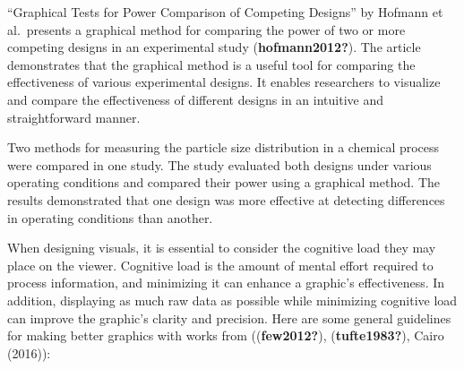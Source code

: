 \documentclass[print]{nuthesis}
\begin{document}
``Graphical Tests for Power Comparison of Competing Designs'' by Hofmann et al.~presents a graphical method for comparing the power of two or more competing designs in an experimental study (\textbf{hofmann2012?}).
The article demonstrates that the graphical method is a useful tool for comparing the effectiveness of various experimental designs.
It enables researchers to visualize and compare the effectiveness of different designs in an intuitive and straightforward manner.

Two methods for measuring the particle size distribution in a chemical process were compared in one study.
The study evaluated both designs under various operating conditions and compared their power using a graphical method.
The results demonstrated that one design was more effective at detecting differences in operating conditions than another.


When designing visuals, it is essential to consider the cognitive load they may place on the viewer.
Cognitive load is the amount of mental effort required to process information, and minimizing it can enhance a graphic's effectiveness.
In addition, displaying as much raw data as possible while minimizing cognitive load can improve the graphic's clarity and precision.
Here are some general guidelines for making better graphics with works from ((\textbf{few2012?}), (\textbf{tufte1983?}), Cairo (2016)):
\end{document}

